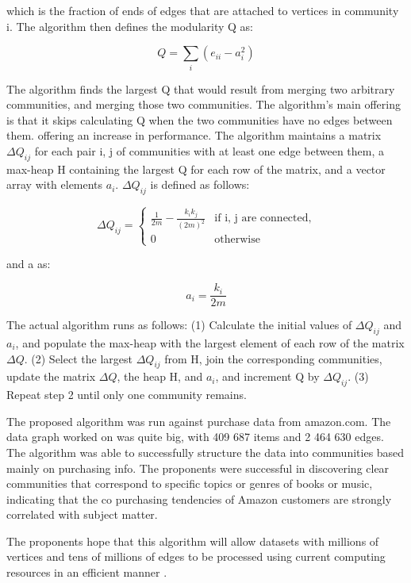 which is the fraction of ends of edges that are attached to vertices in community i. The algorithm then defines the modularity Q as:

\begin{equation}
Q = \sum_{i}({e_{ii}-a_i^2})
\end{equation}

The algorithm finds the largest Q that would result from merging two arbitrary communities, and merging those two communities. The algorithm's main offering is that it skips calculating Q when the two communities have no edges between them. offering an increase in performance. The algorithm maintains a matrix $\Delta Q_{ij}$ for each pair i, j of communities with at least one edge between them, a max-heap H containing the largest Q for each row of the matrix, and a vector array with elements $a_{i}$. $\Delta Q_{ij}$ is defined as follows:

\begin{equation}
\Delta Q_{ij} =
\begin {cases}
\frac{1}{2m}-\frac{k_ik_j}{(2m)^2} &\text{if i, j are connected,}
\\ 0 & \text{otherwise}
\end{cases}
\end{equation}

and a as:

\begin{equation}
a_i = \frac{k_i}{2m}
\end{equation}

The actual algorithm runs as follows:
(1) Calculate the initial values of $\Delta Q_{ij}$ and $a_{i}$, and populate the max-heap with the largest element of each row of the matrix $\Delta Q$.
(2) Select the largest $\Delta Q_{ij}$ from H, join the corresponding
communities, update the matrix $\Delta Q$, the heap H, and $a_{i}$, and increment Q by $\Delta Q_{ij}$.
(3) Repeat step 2 until only one community remains.

The proposed algorithm was run against purchase data from amazon.com. The data graph worked on was quite big, with 409 687 items and 2 464 630 edges. The algorithm was able to successfully structure the data into communities based mainly on purchasing info. The proponents were successful in discovering clear communities that correspond to specific topics or genres of books or music, indicating that the co purchasing tendencies of Amazon customers are strongly correlated with subject matter.

The proponents hope that this algorithm will allow datasets with millions of vertices and tens of millions of edges to be processed using current computing resources in an efficient manner \cite{Clauset:2004}.

